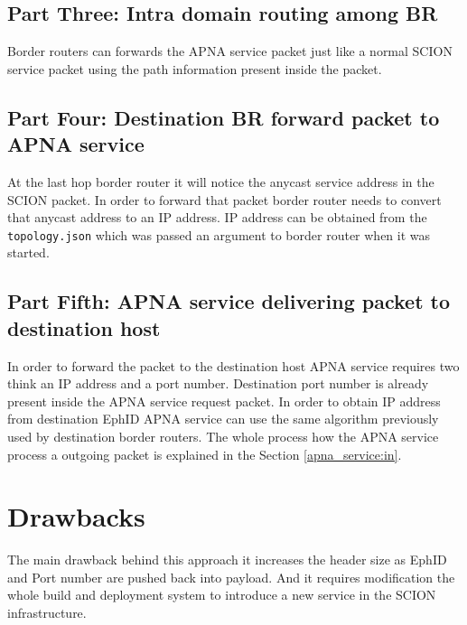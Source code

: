 \subsection{Part Three: Intra domain routing among BR}
Border routers can forwards the APNA service packet just like a normal SCION service packet using the path information present inside the packet.

\subsection{Part Four: Destination BR forward packet to APNA service}
At the last hop border router it will notice the anycast service address in the SCION packet. In order to forward that packet border router needs to convert that anycast address to an IP address. IP address can be obtained from the \texttt{topology.json} which was passed an argument to border router when it was started.

\subsection{Part Fifth: APNA service delivering packet to destination host}
In order to forward the packet to the destination host APNA service requires two think an IP address and a port number. Destination port number is already present inside the APNA service request packet. In order to obtain IP address from destination EphID APNA service can use the same algorithm previously used by destination border routers. The whole process how the APNA service process a outgoing packet is explained in the Section \ref{apna_service:in}.

\section{Drawbacks} \label{srv:draw}
The main drawback behind this approach it increases the header size as EphID and Port number are pushed back into payload. And it requires modification the whole build and deployment system to introduce a new service in the SCION infrastructure.

